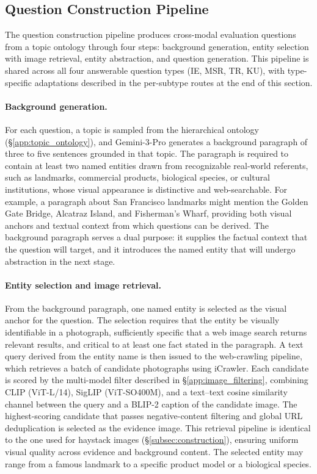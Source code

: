 \documentclass{article}
\begin{document}
\subsection{Question Construction Pipeline}
\label{app:abstraction}

The question construction pipeline produces cross-modal evaluation questions from a topic ontology through four steps: background generation, entity selection with image retrieval, entity abstraction, and question generation. This pipeline is shared across all four answerable question types (IE, MSR, TR, KU), with type-specific adaptations described in the per-subtype routes at the end of this section.

\paragraph{Background generation.}
For each question, a topic is sampled from the hierarchical ontology (\S\ref{app:topic_ontology}), and Gemini-3-Pro generates a background paragraph of three to five sentences grounded in that topic. The paragraph is required to contain at least two named entities drawn from recognizable real-world referents, such as landmarks, commercial products, biological species, or cultural institutions, whose visual appearance is distinctive and web-searchable. For example, a paragraph about San Francisco landmarks might mention the Golden Gate Bridge, Alcatraz Island, and Fisherman's Wharf, providing both visual anchors and textual context from which questions can be derived. The background paragraph serves a dual purpose: it supplies the factual context that the question will target, and it introduces the named entity that will undergo abstraction in the next stage.

\paragraph{Entity selection and image retrieval.}
From the background paragraph, one named entity is selected as the visual anchor for the question. The selection requires that the entity be visually identifiable in a photograph, sufficiently specific that a web image search returns relevant results, and critical to at least one fact stated in the paragraph. A text query derived from the entity name is then issued to the web-crawling pipeline, which retrieves a batch of candidate photographs using iCrawler. Each candidate is scored by the multi-model filter described in \S\ref{app:image_filtering}, combining CLIP (ViT-L/14), SigLIP (ViT-SO400M), and a text--text cosine similarity channel between the query and a BLIP-2 caption of the candidate image. The highest-scoring candidate that passes negative-content filtering and global URL deduplication is selected as the evidence image. This retrieval pipeline is identical to the one used for haystack images (\S\ref{subsec:construction}), ensuring uniform visual quality across evidence and background content. The selected entity may range from a famous landmark to a specific product model or a biological species.
\end{document}
